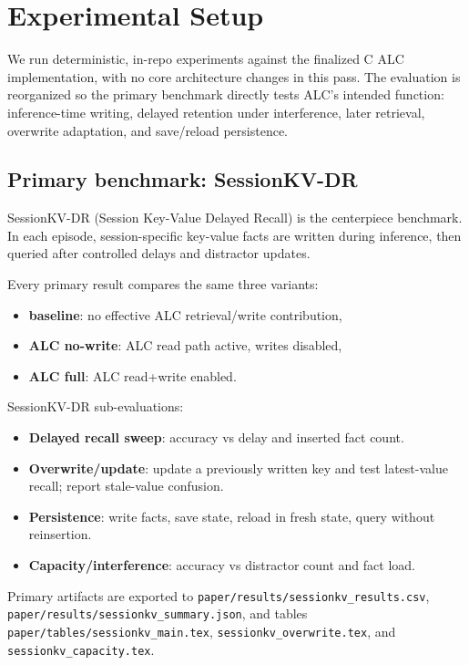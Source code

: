 \section{Experimental Setup}
We run deterministic, in-repo experiments against the finalized C ALC implementation, with no core architecture changes in this pass. The evaluation is reorganized so the primary benchmark directly tests ALC's intended function: inference-time writing, delayed retention under interference, later retrieval, overwrite adaptation, and save/reload persistence.

\subsection{Primary benchmark: SessionKV-DR}
SessionKV-DR (Session Key-Value Delayed Recall) is the centerpiece benchmark. In each episode, session-specific key-value facts are written during inference, then queried after controlled delays and distractor updates.

Every primary result compares the same three variants:
\begin{itemize}
  \item \textbf{baseline}: no effective ALC retrieval/write contribution,
  \item \textbf{ALC no-write}: ALC read path active, writes disabled,
  \item \textbf{ALC full}: ALC read+write enabled.
\end{itemize}

SessionKV-DR sub-evaluations:
\begin{itemize}
  \item \textbf{Delayed recall sweep}: accuracy vs delay and inserted fact count.
  \item \textbf{Overwrite/update}: update a previously written key and test latest-value recall; report stale-value confusion.
  \item \textbf{Persistence}: write facts, save state, reload in fresh state, query without reinsertion.
  \item \textbf{Capacity/interference}: accuracy vs distractor count and fact load.
\end{itemize}

Primary artifacts are exported to \texttt{paper/results/sessionkv\_results.csv}, \texttt{paper/results/sessionkv\_summary.json}, and tables \texttt{paper/tables/sessionkv\_main.tex}, \texttt{sessionkv\_overwrite.tex}, and \texttt{sessionkv\_capacity.tex}.

